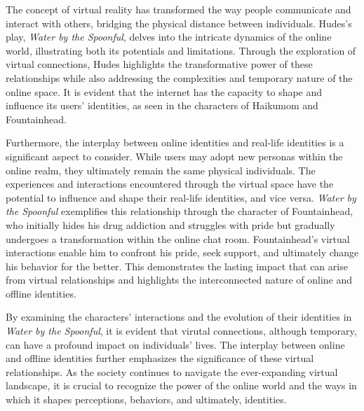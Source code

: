 \documentclass{mla}
\begin{document}
The concept of virtual reality has transformed the way people communicate and interact with others, bridging the physical distance between individuals.
Hudes's play, \textit{Water by the Spoonful}, delves into the intricate dynamics of the online world, illustrating both its potentials and limitations.
Through the exploration of virtual connections, Hudes highlights the transformative power of these relationships while also addressing the complexities and temporary nature of the online space.
It is evident that the internet has the capacity to shape and influence its users' identities, as seen in the characters of Haikumom and Fountainhead.

Furthermore, the interplay between online identities and real-life identities is a significant aspect to consider.
While users may adopt new personas within the online realm, they ultimately remain the same physical individuals.
The experiences and interactions encountered through the virtual space have the potential to influence and shape their real-life identities, and vice versa.
\textit{Water by the Spoonful} exemplifies this relationship through the character of Fountainhead, who initially hides his drug addiction and struggles with pride but gradually undergoes a transformation within the online chat room.
Fountainhead's virtual interactions enable him to confront his pride, seek support, and ultimately change his behavior for the better. This demonstrates the lasting impact that can arise from virtual relationships and highlights the interconnected nature of online and offline identities.

By examining the characters' interactions and the evolution of their identities in \textit{Water by the Spoonful}, it is evident that virutal connections, although temporary, can have a profound impact on individuals' lives.
The interplay between online and offline identities further emphasizes the significance of these virtual relationships.
As the society continues to navigate the ever-expanding virtual landscape, it is crucial to recognize the power of the online world and the ways in which it shapes perceptions, behaviors, and ultimately, identities.
\end{document}
